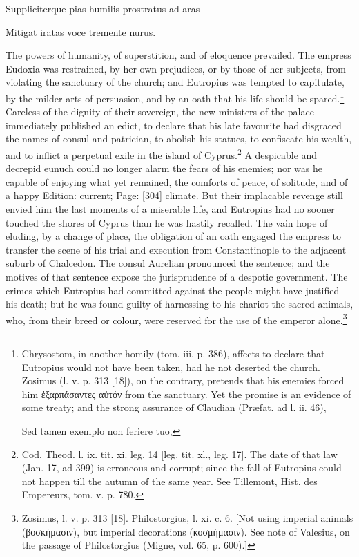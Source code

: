 {Suppliciterque pias humilis prostratus ad aras

Mitigat iratas voce tremente nurus.} The powers of humanity, of superstition, and of eloquence prevailed. The empress Eudoxia was restrained, by her own prejudices, or by those of her subjects, from violating the sanctuary of the church; and Eutropius was tempted to capitulate, by the milder arts of persuasion, and by an oath that his life should be spared.\footnote{Chrysostom, in another homily (tom. iii. p. 386), affects to declare that Eutropius would not have been taken, had he not deserted the church. Zosimus (l. v. p. 313 [18]), on the contrary, pretends that his enemies forced him \textgreek{\texthebrew{ἐ}ξαρπάσαντες α\texthebrew{ὐ}τόν} from the sanctuary. Yet the promise is an evidence of some treaty; and the strong assurance of Claudian (Præfat. ad l. ii. 46),

Sed tamen exemplo non feriere tuo,} Careless of the dignity of their sovereign, the new ministers of the palace immediately published an edict, to declare that his late favourite had disgraced the names of consul and patrician, to abolish his statues, to confiscate his wealth, and to inflict a perpetual exile in the island of Cyprus.\footnote{Cod. Theod. l. ix. tit. xi. leg. 14 [leg. tit. xl., leg. 17]. The date of that law (Jan. 17, ad 399) is erroneous and corrupt; since the fall of Eutropius could not happen till the autumn of the same year. See Tillemont, Hist. des Empereurs, tom. v. p. 780.} A despicable and decrepid eunuch could no longer alarm the fears of his enemies; nor was he capable of enjoying what yet remained, the comforts of peace, of solitude, and of a happy Edition: current; Page: [304] climate. But their implacable revenge still envied him the last moments of a miserable life, and Eutropius had no sooner touched the shores of Cyprus than he was hastily recalled. The vain hope of eluding, by a change of place, the obligation of an oath engaged the empress to transfer the scene of his trial and execution from Constantinople to the adjacent suburb of Chalcedon. The consul Aurelian pronounced the sentence; and the motives of that sentence expose the jurisprudence of a despotic government. The crimes which Eutropius had committed against the people might have justified his death; but he was found guilty of harnessing to his chariot the sacred animals, who, from their breed or colour, were reserved for the use of the emperor alone.\footnote{Zosimus, l. v. p. 313 [18]. Philostorgius, l. xi. c. 6. [Not using imperial animals (\textgreek{βοσκήμασιν}), but imperial decorations (\textgreek{κοσμήμασιν}). See note of Valesius, on the passage of Philostorgius (Migne, vol. 65, p. 600).]}

